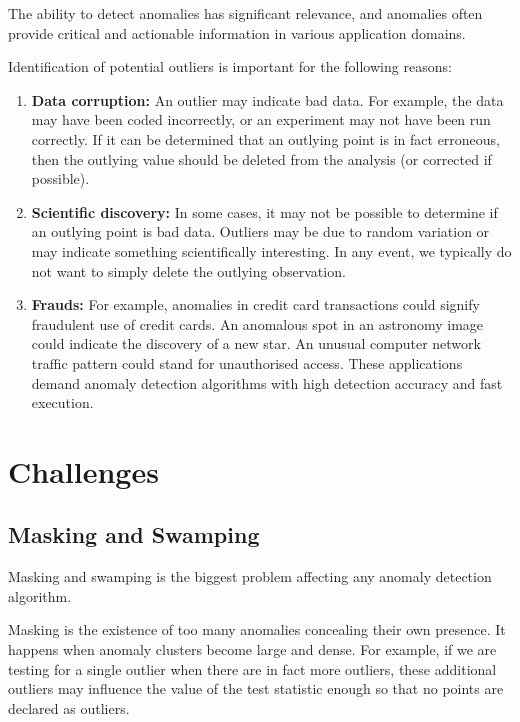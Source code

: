 The ability to detect anomalies has significant relevance, and anomalies often provide critical and actionable information in various application domains.

Identification of potential outliers is important for the following reasons: \cite{EngineeringStatsHandbook}

\begin{enumerate}
    \item \textbf{Data corruption:} An outlier may indicate bad data.
    For example, the data may have been coded incorrectly, or an experiment may not have been run correctly.
    If it can be determined that an outlying point is in fact erroneous, then the outlying value should be deleted from the analysis (or corrected if possible).
    \item \textbf{Scientific discovery:} In some cases, it may not be possible to determine if an outlying point is bad data.
    Outliers may be due to random variation or may indicate something scientifically interesting.
    In any event, we typically do not want to simply delete the outlying observation.
    \item \textbf{Frauds: } For example, anomalies in credit card transactions could signify fraudulent use of credit cards. 
    An anomalous spot in an astronomy image could indicate the discovery of a new star. 
    An unusual computer network traffic pattern could stand for unauthorised access. 
    These applications demand anomaly detection algorithms with high detection accuracy and fast execution.
\end{enumerate}

\section{Challenges}
\label{sec:anomaly-detection-challenges}


\subsection{Masking and Swamping}
\label{subsec:masking-and-swamping}

Masking and swamping is the biggest problem affecting any anomaly detection algorithm.

Masking is the existence of too many anomalies concealing their own presence.
It happens when anomaly clusters become large and dense.
For example, if we are testing for a single outlier when there are in fact more outliers, these additional outliers may influence the value of the test statistic enough so that no points are declared as outliers.

